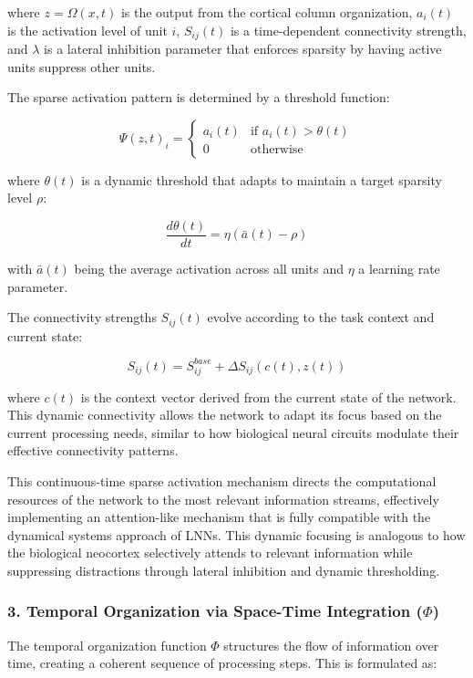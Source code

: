 \documentclass{article}
\begin{document}
where $z = \Omega(x, t)$ is the output from the cortical column organization, $a_i(t)$ is the activation level of unit $i$, $S_{ij}(t)$ is a time-dependent connectivity strength, and $\lambda$ is a lateral inhibition parameter that enforces sparsity by having active units suppress other units.

The sparse activation pattern is determined by a threshold function:

\begin{equation}
\Psi(z, t)_i = \begin{cases}
a_i(t) & \text{if } a_i(t) > \theta(t) \\
0 & \text{otherwise}
\end{cases}
\end{equation}

where $\theta(t)$ is a dynamic threshold that adapts to maintain a target sparsity level $\rho$:

\begin{equation}
\frac{d\theta(t)}{dt} = \eta(\bar{a}(t) - \rho)
\end{equation}

with $\bar{a}(t)$ being the average activation across all units and $\eta$ a learning rate parameter.

The connectivity strengths $S_{ij}(t)$ evolve according to the task context and current state:

\begin{equation}
S_{ij}(t) = S_{ij}^{base} + \Delta S_{ij}(c(t), z(t))
\end{equation}

where $c(t)$ is the context vector derived from the current state of the network. This dynamic connectivity allows the network to adapt its focus based on the current processing needs, similar to how biological neural circuits modulate their effective connectivity patterns.

This continuous-time sparse activation mechanism directs the computational resources of the network to the most relevant information streams, effectively implementing an attention-like mechanism that is fully compatible with the dynamical systems approach of LNNs. This dynamic focusing is analogous to how the biological neocortex selectively attends to relevant information while suppressing distractions through lateral inhibition and dynamic thresholding.

\subsubsection{3. Temporal Organization via Space-Time Integration ($\Phi$)}
The temporal organization function $\Phi$ structures the flow of information over time, creating a coherent sequence of processing steps. This is formulated as:
\end{document}
